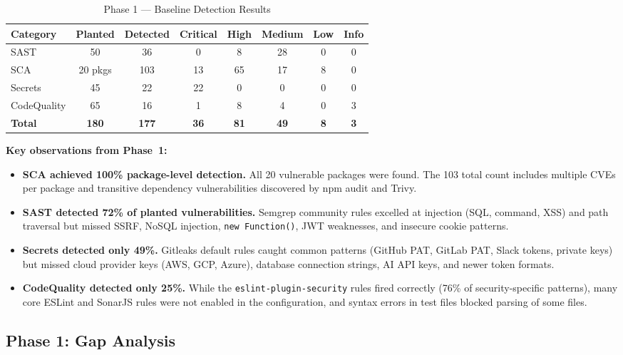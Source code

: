 \documentclass[12pt,a4paper]{report}
\begin{document}
\begin{table}[H]
\centering
\caption{Phase 1 --- Baseline Detection Results}
\label{tab:phase1_results}
\begin{tabular}{|l|c|c|c|c|c|c|c|}
\hline
\textbf{Category} & \textbf{Planted} & \textbf{Detected} & \textbf{Critical} & \textbf{High} & \textbf{Medium} & \textbf{Low} & \textbf{Info} \\
\hline
SAST & 50 & 36 & 0 & 8 & 28 & 0 & 0 \\
\hline
SCA & 20 pkgs & 103 & 13 & 65 & 17 & 8 & 0 \\
\hline
Secrets & 45 & 22 & 22 & 0 & 0 & 0 & 0 \\
\hline
CodeQuality & 65 & 16 & 1 & 8 & 4 & 0 & 3 \\
\hline
\textbf{Total} & \textbf{180} & \textbf{177} & \textbf{36} & \textbf{81} & \textbf{49} & \textbf{8} & \textbf{3} \\
\hline
\end{tabular}
\end{table}

\textbf{Key observations from Phase~1:}

\begin{itemize}
    \item \textbf{SCA achieved 100\% package-level detection.} All 20 vulnerable packages were found. The 103 total count includes multiple CVEs per package and transitive dependency vulnerabilities discovered by npm audit and Trivy.
    \item \textbf{SAST detected 72\% of planted vulnerabilities.} Semgrep community rules excelled at injection (SQL, command, XSS) and path traversal but missed SSRF, NoSQL injection, \texttt{new Function()}, JWT weaknesses, and insecure cookie patterns.
    \item \textbf{Secrets detected only 49\%.} Gitleaks default rules caught common patterns (GitHub PAT, GitLab PAT, Slack tokens, private keys) but missed cloud provider keys (AWS, GCP, Azure), database connection strings, AI API keys, and newer token formats.
    \item \textbf{CodeQuality detected only 25\%.} While the \texttt{eslint-plugin-security} rules fired correctly (76\% of security-specific patterns), many core ESLint and SonarJS rules were not enabled in the configuration, and syntax errors in test files blocked parsing of some files.
\end{itemize}

\subsection{Phase 1: Gap Analysis}
\end{document}
